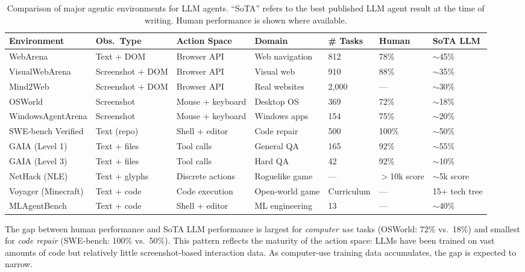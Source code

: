 \begin{table}[ht!]
\centering
\caption{Comparison of major agentic environments for LLM agents. ``SoTA'' refers to the best published LLM agent result at the time of writing. Human performance is shown where available.}
\label{tab:env-comparison}
\begin{tabular}{@{}lp{2.1cm}p{2.1cm}p{2.1cm}p{2.1cm}p{2.1cm}p{2.1cm}@{}}
\toprule
\textbf{Environment} & \textbf{Obs.~Type} & \textbf{Action Space} & \textbf{Domain} & \textbf{\# Tasks} & \textbf{Human} & \textbf{SoTA LLM} \\
\midrule
WebArena & Text + DOM & Browser API & Web navigation & 812 & 78\% & $\sim$45\% \\
VisualWebArena & Screenshot + DOM & Browser API & Visual web & 910 & 88\% & $\sim$35\% \\
Mind2Web & Screenshot + DOM & Browser API & Real websites & 2,000 & --- & $\sim$30\% \\
OSWorld & Screenshot & Mouse + keyboard & Desktop OS & 369 & 72\% & $\sim$18\% \\
WindowsAgentArena & Screenshot & Mouse + keyboard & Windows apps & 154 & 75\% & $\sim$20\% \\
SWE-bench Verified & Text (repo) & Shell + editor & Code repair & 500 & 100\% & $\sim$50\% \\
GAIA (Level 1) & Text + files & Tool calls & General QA & 165 & 92\% & $\sim$55\% \\
GAIA (Level 3) & Text + files & Tool calls & Hard QA & 42 & 92\% & $\sim$10\% \\
NetHack (NLE) & Text + glyphs & Discrete actions & Roguelike game & --- & $>$10k score & $\sim$5k score \\
Voyager (Minecraft) & Text + code & Code execution & Open-world game & Curriculum & --- & 15+ tech tree \\
MLAgentBench & Text + code & Shell + editor & ML engineering & 13 & --- & $\sim$40\% \\
\bottomrule
\end{tabular}
\end{table}

\begin{intuitionbox}
The gap between human performance and SoTA LLM performance is largest for \emph{computer use} tasks (OSWorld: 72\% vs.~18\%) and smallest for \emph{code repair} (SWE-bench: 100\% vs.~50\%). This pattern reflects the maturity of the action space: LLMs have been trained on vast amounts of code but relatively little screenshot-based interaction data. As computer-use training data accumulates, the gap is expected to narrow.
\end{intuitionbox}

